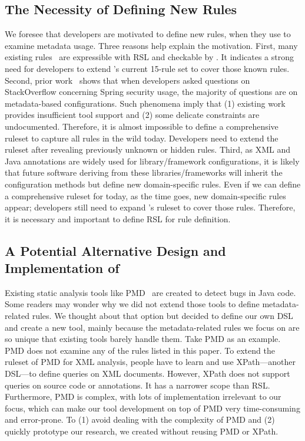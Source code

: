 \subsection{The Necessity of Defining New Rules}

We foresee that developers are motivated to define new rules, when they use \tool to examine metadata usage. Three reasons help explain the motivation. 
First, many existing rules~\cite{inspect} are expressible with RSL and checkable by \tool. It indicates a strong need for developers to extend \tool's current 15-rule set to cover those known rules.
Second, prior work~\cite{meng2018secure} shows that when developers asked questions on StackOverflow concerning Spring security usage, the majority of questions are on metadata-based configurations. Such phenomena imply that (1) existing work provides insufficient tool support and (2) some delicate constraints are undocumented. Therefore, it is almost impossible to define a comprehensive ruleset to capture all rules in the wild today. Developers need to extend the ruleset after revealing previously unknown or hidden rules.
Third, as XML and Java annotations are widely used for library/framework configurations, it is likely that future software deriving from these libraries/frameworks will inherit the configuration methods but define new domain-specific rules. Even if we can define a comprehensive ruleset for \tool today, as the time goes, new domain-specific rules appear; developers still need to expand \tool's ruleset  to cover those rules. Therefore, it is necessary and important to define RSL for rule definition.

\subsection{A Potential Alternative Design and Implementation of \tool}
Existing static analysis tools like PMD~\cite{pmd} are created to detect bugs in Java code. Some readers may wonder why we did not extend those tools to define metadata-related rules. We thought about that option but decided to define our own DSL and create a new tool, mainly because the metadata-related rules we focus on are so unique that existing tools barely handle them. Take PMD as an example. PMD does not examine any of the rules listed in this paper. To extend the ruleset of PMD for XML analysis, people have to learn and use XPath---another DSL---to define queries on XML documents. However, XPath does not support queries on source code or annotations. It has a narrower scope than RSL. Furthermore, PMD is complex, with lots of implementation irrelevant to our focus, which can make our tool development on top of PMD very time-consuming and error-prone. To (1) avoid dealing with the complexity of PMD and (2) quickly prototype our research, we created \tool without reusing PMD or XPath.